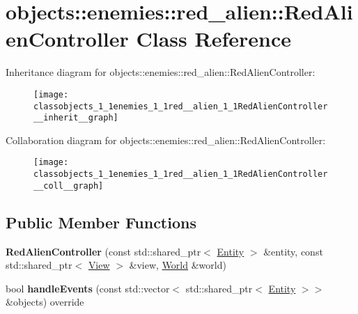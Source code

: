 \hypertarget{classobjects_1_1enemies_1_1red__alien_1_1RedAlienController}{}\section{objects\+:\+:enemies\+:\+:red\+\_\+alien\+:\+:Red\+Alien\+Controller Class Reference}
\label{classobjects_1_1enemies_1_1red__alien_1_1RedAlienController}


Inheritance diagram for objects\+:\+:enemies\+:\+:red\+\_\+alien\+:\+:Red\+Alien\+Controller\+:\nopagebreak
\begin{figure}[H]
\begin{center}
\leavevmode
\texttt{[image: classobjects\_1\_1enemies\_1\_1red\_\_alien\_1\_1RedAlienController\_\_inherit\_\_graph]}
\end{center}
\end{figure}


Collaboration diagram for objects\+:\+:enemies\+:\+:red\+\_\+alien\+:\+:Red\+Alien\+Controller\+:\nopagebreak
\begin{figure}[H]
\begin{center}
\leavevmode
\texttt{[image: classobjects\_1\_1enemies\_1\_1red\_\_alien\_1\_1RedAlienController\_\_coll\_\_graph]}
\end{center}
\end{figure}
\subsection*{Public Member Functions}
\begin{DoxyCompactItemize}
\item 
\mbox{\label{classobjects_1_1enemies_1_1red__alien_1_1RedAlienController_aebe17931bfbc588e09390846417684d5}}
{\bfseries Red\+Alien\+Controller} (const std\+::shared\+\_\+ptr$<$ \hyperlink{classobjects_1_1Entity}{Entity} $>$ \&entity, const std\+::shared\+\_\+ptr$<$ \hyperlink{classobjects_1_1View}{View} $>$ \&view, \hyperlink{classWorld}{World} \&world)
\item 
\mbox{\label{classobjects_1_1enemies_1_1red__alien_1_1RedAlienController_a60cd9e9d872c44c28827316255298e33}}
bool {\bfseries handle\+Events} (const std\+::vector$<$ std\+::shared\+\_\+ptr$<$ \hyperlink{classobjects_1_1Entity}{Entity} $>$$>$ \&objects) override
\end{DoxyCompactItemize}
